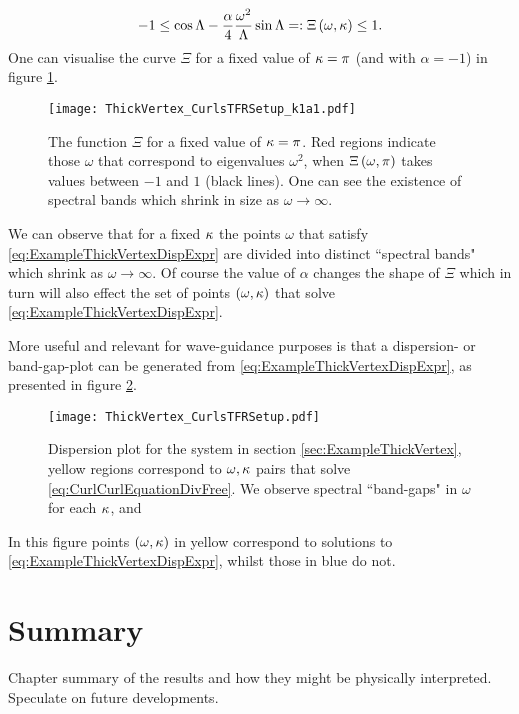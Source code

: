 \begin{align} \label{eq:ExampleThickVertexDispExpr}
	-1 \leq \cos\Lambda - \frac{\alpha}{4}\frac{\omega^2}{\Lambda}\sin\Lambda =: \Xi\left( \omega, \kappa \right) \leq 1.
\end{align}
One can visualise the curve $\Xi$ for a fixed value of $\kappa=\pi$ (and with $\alpha=-1$) in figure \ref{fig:ThickVertex_CurlsTFRSetup_k1a1}.
\begin{figure}[b!]
	\centering
	\texttt{[image: ThickVertex\_CurlsTFRSetup\_k1a1.pdf]}
	\caption{\label{fig:ThickVertex_CurlsTFRSetup_k1a1} The function $\Xi$ for a fixed value of $\kappa=\pi$. Red regions indicate those $\omega$ that correspond to eigenvalues $\omega^2$, when $\Xi\left( \omega, \pi \right)$ takes values between $-1$ and $1$ (black lines). One can see the existence of spectral bands which shrink in size as $\omega\rightarrow\infty$.}
\end{figure}
We can observe that for a fixed $\kappa$ the points $\omega$ that satisfy \eqref{eq:ExampleThickVertexDispExpr} are divided into distinct ``spectral bands" which shrink as $\omega\rightarrow\infty$. 
Of course the value of $\alpha$ changes the shape of $\Xi$ which in turn will also effect the set of points $\left( \omega, \kappa \right)$ that solve \eqref{eq:ExampleThickVertexDispExpr}. \newline

More useful and relevant for wave-guidance purposes is that a dispersion- or band-gap-plot can be generated from \eqref{eq:ExampleThickVertexDispExpr}, as presented in figure \ref{fig:ThickVertex_CurlsTFRSetup}.
\begin{figure}[h]
	\centering
	\texttt{[image: ThickVertex\_CurlsTFRSetup.pdf]}
	\caption{\label{fig:ThickVertex_CurlsTFRSetup} Dispersion plot for the system in section \ref{sec:ExampleThickVertex}, yellow regions correspond to $\omega, \kappa$ pairs that solve \eqref{eq:CurlCurlEquationDivFree}. We observe spectral ``band-gaps" in $\omega$ for each $\kappa$, and }
\end{figure}
In this figure points $\left( \omega, \kappa \right)$ in yellow correspond to solutions to \eqref{eq:ExampleThickVertexDispExpr}, whilst those in blue do not.

\section{Summary}
Chapter summary of the results and how they might be physically interpreted.
Speculate on future developments.